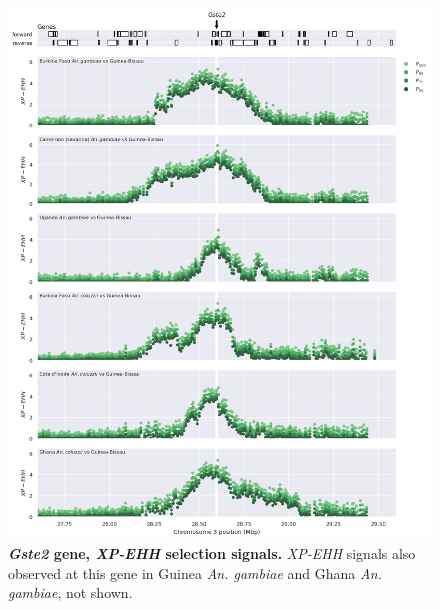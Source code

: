 \documentclass[a4paper,11pt,abstracton,hidelinks]{scrartcl}
\begin{document}
\begin{figure}[t!]
	\begin{center}
		\includegraphics*[width=1.1\linewidth,center]{artwork/locus_gste2_xpehh.png}
	\end{center}
	\caption[\textit{Gste2} gene, \textit{XP-EHH} selection signals]{
	\textbf{\textit{Gste2} gene, \textit{XP-EHH} selection signals.}
	\textit{XP-EHH} signals also observed at this gene in Guinea \textit{An. gambiae} and Ghana \textit{An. gambiae}, not shown. 
	} 
	\label{fig:locus_gste2_xpehh}
\end{figure}
\end{document}
